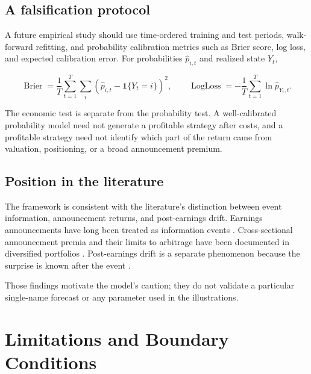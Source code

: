 \subsection{A falsification protocol}

A future empirical study should use time-ordered training and test periods,
walk-forward refitting, and probability calibration metrics such as Brier score,
log loss, and expected calibration error. For probabilities $\hat p_{i,t}$ and
realized state $Y_t$,

\[
\operatorname{Brier}
=\frac1T\sum_{t=1}^{T}\sum_i
\left(\hat p_{i,t}-\mathbf 1\{Y_t=i\}\right)^2,
\qquad
\operatorname{LogLoss}
=-\frac1T\sum_{t=1}^{T}\ln\hat p_{Y_t,t}.
\]

The economic test is separate from the probability test. A well-calibrated
probability model need not generate a profitable strategy after costs, and a
profitable strategy need not identify which part of the return came from
valuation, positioning, or a broad announcement premium.

\subsection{Position in the literature}

The framework is consistent with the literature's distinction between event
information, announcement returns, and post-earnings drift. Earnings
announcements have long been treated as information events
\cite{beaver1968,ball1968,chari1988}. Cross-sectional announcement premia and
their limits to arbitrage have been documented in diversified portfolios
\cite{cohen2007,frazzini2007,savor2016,barber2013}. Post-earnings drift is a
separate phenomenon because the surprise is known after the event
\cite{bernard1989,linnainmaa2019}.

Those findings motivate the model's caution; they do not validate a particular
single-name forecast or any parameter used in the illustrations.

\section{Limitations and Boundary Conditions}
\label{sec:limitations}

